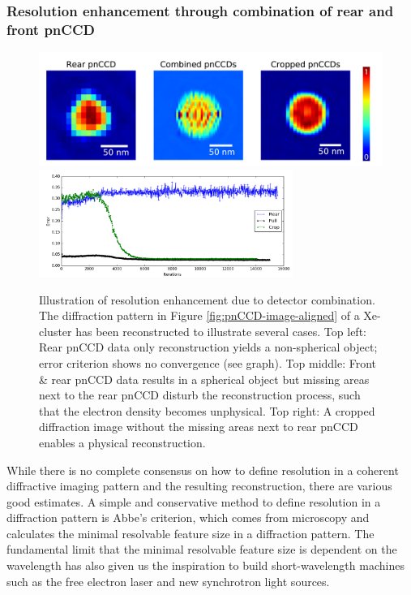 \subsubsection{Resolution enhancement through combination of rear and front pnCCD}\label{sec:resolution-discussion}
\begin{figure}
  \begin{center}
   \includegraphics[width=1\linewidth]{images/Phase-retrieval-image.png}\\
   \includegraphics[height=3.5cm]{images/Phase-retrieval-error.png}
    \caption[Illustration of resolution enhancement and diffraction image cropping.]{Illustration of resolution enhancement due to detector combination. The diffraction pattern in Figure \ref{fig:pnCCD-image-aligned} of a Xe-cluster has been reconstructed to illustrate several cases. Top left: Rear pnCCD data only reconstruction yields a non-spherical object; error criterion shows no convergence (see graph). Top middle: Front \& rear pnCCD data results in a spherical object but missing areas next to the rear pnCCD disturb the reconstruction process, such that the electron density becomes unphysical. Top right: A cropped diffraction image without the missing areas next to rear pnCCD enables a physical reconstruction.}
\label{fig:phase-retrieval-image}
  \end{center}
\end{figure}
While there is no complete consensus on how to define resolution in a coherent diffractive imaging pattern and the resulting reconstruction, there are various good estimates. A simple and conservative method to define resolution in a diffraction pattern is Abbe's criterion, which comes from microscopy and calculates the minimal resolvable feature size in a diffraction pattern. The fundamental limit that the minimal resolvable feature size is dependent on the wavelength has also given us the inspiration to build short-wavelength machines such as the free electron laser and new synchrotron light sources.\\[1\baselineskip]
